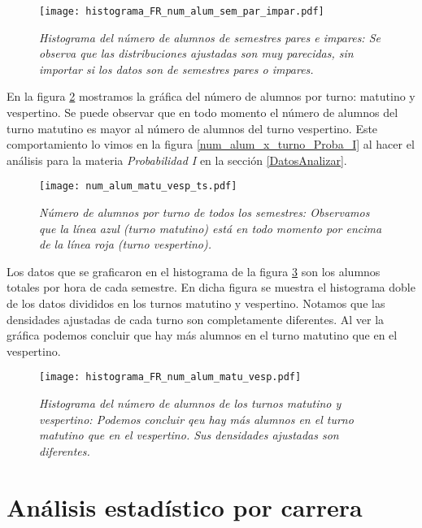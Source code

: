 \begin{figure}[H]
\centering
\texttt{[image: histograma\_FR\_num\_alum\_sem\_par\_impar.pdf]} %
\caption[\textit{Histograma del número de alumnos de semestres pares e impares}]{\textit{Histograma del número de alumnos de semestres pares e impares: Se observa que las distribuciones ajustadas son muy parecidas, sin importar si los datos son de semestres pares o impares.}}\label{histNumAlTotal_ParImpar}
\end{figure}


En la figura \ref{NumAlTotal_MatuVesp_ts} mostramos la gráfica del número de alumnos por turno: matutino y vespertino. Se puede observar que en todo momento el número de alumnos del turno matutino es mayor al número de alumnos del turno vespertino. Este comportamiento lo vimos en la figura \ref{num_alum_x_turno_Proba_I} al hacer el análisis para la materia \textit{Probabilidad I} en la sección \ref{DatosAnalizar}.

\begin{figure}[H]
\centering
\texttt{[image: num\_alum\_matu\_vesp\_ts.pdf]} %
\caption[\textit{Número de alumnos por turno de todos los semestres}]{\textit{Número de alumnos por turno de todos los semestres: Observamos que la línea azul (turno matutino) está en todo momento por encima de la línea roja (turno vespertino).}}\label{NumAlTotal_MatuVesp_ts}
\end{figure}


Los datos que se graficaron en el histograma de la figura \ref{histNumAlTotal_MatuVesp} son los alumnos totales por hora de cada semestre. En dicha figura se muestra el histograma doble de los datos divididos en los turnos matutino y vespertino. Notamos que las densidades ajustadas de cada turno son completamente diferentes. Al ver la gráfica podemos concluir que hay más alumnos en el turno matutino que en el vespertino.

\begin{figure}[H]
\centering
\texttt{[image: histograma\_FR\_num\_alum\_matu\_vesp.pdf]} %
\caption[\textit{Histograma del número de alumnos de los turnos matutino y vespertino}]{\textit{Histograma del número de alumnos de los turnos matutino y vespertino: Podemos concluir qeu hay más alumnos en el turno matutino que en el vespertino. Sus densidades ajustadas son diferentes.}}\label{histNumAlTotal_MatuVesp}
\end{figure}


\section{Análisis estadístico por carrera}

